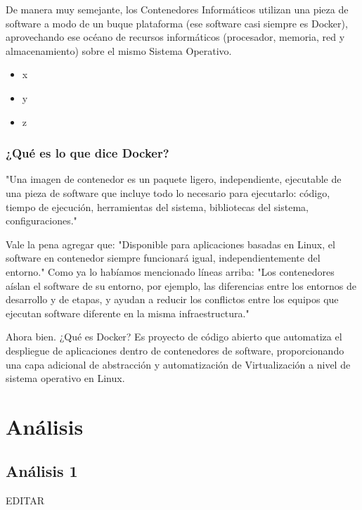 \documentclass[preprint,12pt]{elsarticle}
\begin{document}
De manera muy semejante, los Contenedores Informáticos utilizan una pieza de software a modo de un buque plataforma (ese software casi siempre es Docker), aprovechando ese océano de recursos informáticos (procesador, memoria, red y almacenamiento) sobre el mismo Sistema Operativo.

\begin{itemize}

\item x
\item y
\item z

\end{itemize}
\subsubsection{\textbf{¿Qué es lo que dice Docker?}}
"Una imagen de contenedor es un paquete ligero, independiente, ejecutable de una pieza de software que incluye todo lo necesario para ejecutarlo: código, tiempo de ejecución, herramientas del sistema, bibliotecas del sistema, configuraciones."

Vale la pena agregar que: "Disponible para aplicaciones basadas en Linux, el software en contenedor siempre funcionará igual, independientemente del entorno." Como ya lo habíamos mencionado líneas arriba: "Los contenedores aíslan el software de su entorno, por ejemplo, las diferencias entre los entornos de desarrollo y de etapas, y ayudan a reducir los conflictos entre los equipos que ejecutan software diferente en la misma infraestructura."

Ahora bien. ¿Qué es Docker? Es proyecto de código abierto que automatiza el despliegue de aplicaciones dentro de contenedores de software, proporcionando una capa adicional de abstracción y automatización de Virtualización a nivel de sistema operativo en Linux.


 



\section{Análisis}

\subsection{\textbf{Análisis 1}}
EDITAR\\
\end{document}
